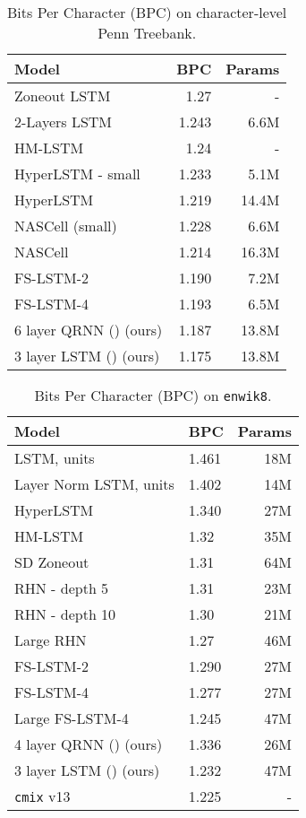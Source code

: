 \documentclass{article}
\newcommand{\enwik}{\texttt{enwik8}\xspace}
\begin{document}
\begin{table}
\begin{center}
 \begin{tabular}{@{}l r r@{}}
\toprule[1.5pt]
Model & BPC & Params \\
\midrule
Zoneout LSTM \cite{Krueger2016}& 1.27 & -\\
2-Layers LSTM \cite{fastslowlm} & 1.243 & 6.6M\\
 HM-LSTM \cite{chung2016hierarchical}& 1.24 & - \\
 HyperLSTM - small \cite{ha2016hypernetworks}& 1.233 & 5.1M \\
 HyperLSTM \cite{ha2016hypernetworks} & 1.219 & 14.4M \\
 NASCell (small) \cite{Zoph2016} & 1.228 & 6.6M \\
 NASCell \cite{Zoph2016} & 1.214 & 16.3M \\
 FS-LSTM-2 \cite{fastslowlm} & 1.190 & 7.2M \\
 FS-LSTM-4 \cite{fastslowlm} & 1.193 & 6.5M \\
 \midrule
 6 layer QRNN () (ours) & 1.187 & 13.8M \\
 3 layer LSTM () (ours) & 1.175 & 13.8M \\
 \bottomrule
\end{tabular}
\end{center}
\caption{Bits Per Character (BPC) on character-level Penn Treebank.}
\label{table:ptb}
\end{table}

\begin{table}
\begin{center}
 \begin{tabular}{@{} llr @{}}
 \toprule[1.5pt]
 Model & BPC & Params \\
 \midrule
 LSTM,  units \cite{fastslowlm} & 1.461 & 18M \\
 Layer Norm LSTM,  units & 1.402 & 14M\\
 HyperLSTM \cite{ha2016hypernetworks} & 1.340 & 27M \\
 HM-LSTM \cite{chung2016hierarchical}& 1.32 & 35M \\
 SD Zoneout \cite{rocki2016surprisal} & 1.31 & 64M \\
 RHN - depth 5 \cite{Zilly2016}& 1.31 & 23M \\
 RHN - depth 10  \cite{Zilly2016}& 1.30 & 21M \\
 Large RHN \cite{Zilly2016}& 1.27 & 46M \\
 FS-LSTM-2 \cite{fastslowlm} & 1.290 & 27M \\
 FS-LSTM-4 \cite{fastslowlm} & 1.277 & 27M \\
 Large FS-LSTM-4 \cite{fastslowlm} & 1.245 & 47M \\
 \midrule
 4 layer QRNN () (ours) & 1.336 & 26M \\
 3 layer LSTM () (ours) & 1.232 & 47M \\
 \midrule
 \texttt{cmix} v13 \cite{cmix}  & 1.225 & - \\
 \bottomrule
\end{tabular}
\end{center}
\caption{Bits Per Character (BPC) on \enwik.}
\label{table:enwik8}
\end{table}
\end{document}
